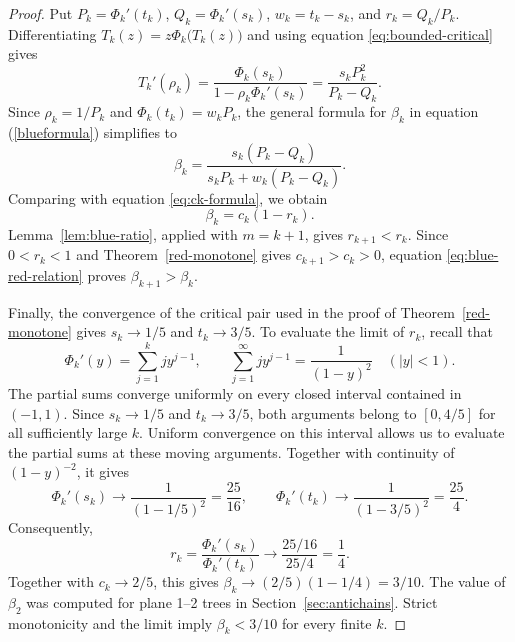 \documentclass[11pt, onesided]{amsart}
\theoremstyle{remark}
\begin{document}
\begin{proof}
Put $P_k=\Phi_k'(t_k)$, $Q_k=\Phi_k'(s_k)$, $w_k=t_k-s_k$,
and $r_k=Q_k/P_k$. Differentiating $T_k(z)=z\Phi_k\big(T_k(z)\big)$
and using equation \eqref{eq:bounded-critical} gives
\[
T_k'(\rho_k)
=\frac{\Phi_k(s_k)}{1-\rho_k\Phi_k'(s_k)}
=\frac{s_kP_k^2}{P_k-Q_k}.
\]
Since $\rho_k=1/P_k$ and $\Phi_k(t_k)=w_kP_k$, the general formula for $\beta_k$ in equation (\ref{blueformula})
simplifies to
\[
\beta_k=\frac{s_k(P_k-Q_k)}{s_kP_k+w_k(P_k-Q_k)}.
\]
Comparing with equation \eqref{eq:ck-formula}, we obtain
\begin{equation}\label{eq:blue-red-relation}
\beta_k=c_k(1-r_k).
\end{equation}
Lemma~\ref{lem:blue-ratio}, applied with $m=k+1$, gives
$r_{k+1}<r_k$. Since $0<r_k<1$ and
Theorem~\ref{red-monotone} gives $c_{k+1}>c_k>0$, equation
\eqref{eq:blue-red-relation} proves $\beta_{k+1}>\beta_k$.

Finally, the convergence of the critical pair used in the proof of
Theorem~\ref{red-monotone} gives $s_k\to1/5$ and $t_k\to3/5$.
To evaluate the limit of $r_k$, recall that
\[
\Phi_k'(y)=\sum_{j=1}^k jy^{j-1},
\qquad
\sum_{j=1}^{\infty}jy^{j-1}=\frac{1}{(1-y)^2}
\quad (|y|<1).
\]
The partial sums converge uniformly on every closed interval contained
in $(-1,1)$. Since $s_k\to1/5$ and $t_k\to3/5$, both arguments
belong to $[0,4/5]$ for all sufficiently large $k$. Uniform convergence
on this interval allows us to evaluate the partial sums at these moving
arguments. Together with continuity of $(1-y)^{-2}$, it gives
\[
\Phi_k'(s_k)\longrightarrow\frac{1}{(1-1/5)^2}=\frac{25}{16},
\qquad
\Phi_k'(t_k)\longrightarrow\frac{1}{(1-3/5)^2}=\frac{25}{4}.
\]
Consequently,
\[
r_k=\frac{\Phi_k'(s_k)}{\Phi_k'(t_k)}
\longrightarrow\frac{25/16}{25/4}=\frac14.
\]
Together with $c_k\to2/5$, this gives
$\beta_k\to(2/5)(1-1/4)=3/10$.
The value of $\beta_2$ was computed for plane 1--2 trees in
Section~\ref{sec:antichains}. Strict monotonicity and the limit imply
$\beta_k<3/10$ for every finite $k$.
\end{proof}
\end{document}
